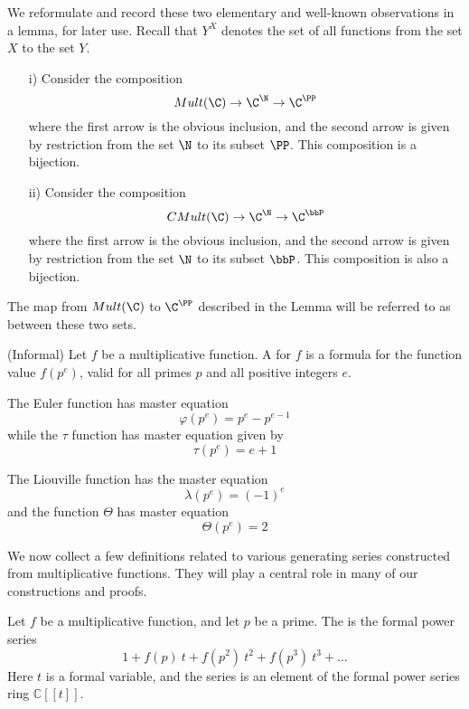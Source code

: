 \documentclass[a4paper]{article}
\begin{document}
We reformulate and record these two elementary and well-known observations in a lemma, for later use. Recall that $Y^X$ denotes the set of all functions from the set $X$ to the set $Y$.


\begin{lemma} \label{AffineSpaceLemma}
\begin{itemize}
\item[i)] Consider the composition
$$ Mult(\C) \rightarrow \C^{\N} \rightarrow \C^{\PP}   $$
where the first arrow is the obvious inclusion, and the second arrow is given by restriction from the set $\N$ to its subset $\PP$. This composition is a bijection.
\item[ii)] Consider the composition
$$ CMult(\C) \rightarrow \C^{\N} \rightarrow \C^{\bbP}   $$
where the first arrow is the obvious inclusion, and the second arrow is given by restriction from the set $\N$ to its subset $\bbP$. This composition is also a bijection.
\end{itemize}
\end{lemma}

\begin{definition}
The map from $Mult(\C)$ to $\C^{\PP}$ described in the Lemma will be referred to as  between these two sets.
\end{definition}

\begin{definition}
(Informal) Let $f$ be a multiplicative function. A  for $f$ is a formula for the function value $f(p^e)$, valid for all primes $p$ and all positive integers $e$.
\end{definition}

\begin{example}
The Euler function has master equation 
$$ \varphi(p^e) = p^e - p^{e-1}   $$
while the $\tau$ function has master equation given by 
$$ \tau(p^e) = e+1  $$
\end{example}

\begin{example}
The Liouville function has the master equation
$$ \lambda(p^e) = (-1)^e  $$
and the function $\Theta$ has master equation
$$ \Theta(p^e) = 2   $$
\end{example}

We now collect a few definitions related to various generating series constructed from multiplicative functions. They will play a central role in many of our constructions and proofs.

\begin{definition}
Let $f$ be a multiplicative function, and let $p$ be a prime. The  is the formal power series
$$ 1 + f(p) \ t + f(p^2) \ t^2 + f(p^3) \ t^3 + \ldots    $$ 
Here $t$ is a formal variable, and the series is an element of the formal power series ring $\mathbb{C}[[t]]$.
\end{definition}
\end{document}
